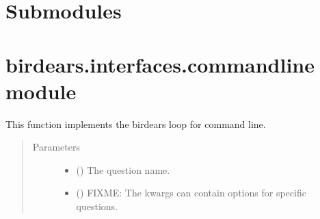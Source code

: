 \documentclass[letterpaper,10pt,english]{sphinxmanual}
\begin{document}
\section{Submodules}
\label{\detokenize{index:id13}}

\section{birdears.interfaces.commandline module}
\label{\detokenize{index:module-birdears.interfaces.commandline}}\label{\detokenize{index:birdears-interfaces-commandline-module}}

\begin{fulllineitems}
\label{\detokenize{index:birdears.interfaces.commandline.CommandLine}}
This function implements the birdears loop for command line.
\begin{quote}\begin{description}
\item[{Parameters}] \leavevmode\begin{itemize}
\item {} 
 () \textendash{} The question name.

\item {} 
 () \textendash{} FIXME: The kwargs can contain options for specific
questions.

\end{itemize}

\end{description}\end{quote}

\end{fulllineitems}

\end{document}
